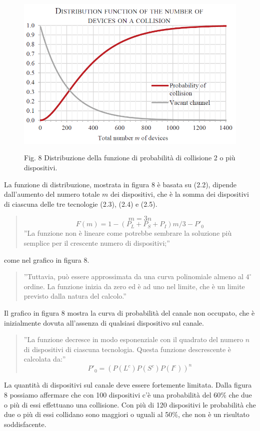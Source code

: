 \documentclass[a4paper]{report} %
\begin{document}
\begin{figure}
\centering
\includegraphics[scale=.5]{Immagini/DistribuzioneDiProb.png}

Fig. 8 Distribuzione della funzione di probabilità di collisione 2 o più dispositivi.
\end{figure}

La funzione di distribuzione, mostrata in figura 8 è basata su (2.2), dipende dall'aumento del numero totale $m$ dei dispositivi, che è la somma dei dispositivi di ciascuna delle tre tecnologie (2.3), (2.4) e (2.5).
\begin{quote}
	\begin{equation}
	m = 3n 
	\end{equation}
	\begin{equation}
	F(m) = 1 - (P_L+P_S+P_I)m/3 - P'_0 
	\end{equation}
	''La funzione non è lineare come potrebbe sembrare la soluzione più semplice per il crescente numero di dispositivi;''
\end{quote}
come nel grafico in figura 8. 
\begin{quote}
	''Tuttavia, può essere approssimata da una curva polinomiale almeno al $4^{\circ}$ ordine. La funzione inizia da zero ed è ad uno nel limite, che è un limite previsto dalla natura del calcolo.'' 
\end{quote}
Il grafico in figura 8 mostra la curva di probabilità del canale non occupato, che è inizialmente dovuta all'assenza di qualsiasi dispositivo sul canale. 
\begin{quote}
	''La funzione decresce in modo esponenziale con il quadrato del numero $n$ di dispositivi di ciascuna tecnologia. Questa funzione descrescente è calcolata da:''
	\begin{equation}
	P'_0 = (P(L^c)P(S^c)P(I^c))^n 
	\end{equation}
\end{quote}
La quantità di dispositivi sul canale deve essere fortemente limitata. Dalla figura 8 possiamo affermare che con 100 dispositivi c'è una probabilità del 60\% che due o più di essi effettuano una collisione. Con più di 120 dispositivi le probabilità che due o più di essi collidano sono maggiori o uguali al 50\%, che non è un risultato soddisfacente.
\end{document}

